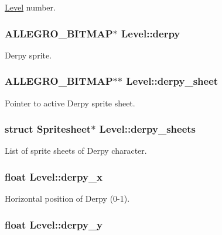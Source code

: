 \hyperlink{structLevel}{\-Level} number. \hypertarget{structLevel_ae33832497116b7a0c184959bbde21ee5}{
\subsubsection[{derpy}]{\setlength{\rightskip}{0pt plus 5cm}\-A\-L\-L\-E\-G\-R\-O\-\_\-\-B\-I\-T\-M\-A\-P$\ast$ {\bf \-Level\-::derpy}}}\label{structLevel_ae33832497116b7a0c184959bbde21ee5}
\-Derpy sprite. \hypertarget{structLevel_a0e02f3a5674a2ad3c23de22b6a4ed044}{
\subsubsection[{derpy\-\_\-sheet}]{\setlength{\rightskip}{0pt plus 5cm}\-A\-L\-L\-E\-G\-R\-O\-\_\-\-B\-I\-T\-M\-A\-P$\ast$$\ast$ {\bf \-Level\-::derpy\-\_\-sheet}}}\label{structLevel_a0e02f3a5674a2ad3c23de22b6a4ed044}
\-Pointer to active \-Derpy sprite sheet. \hypertarget{structLevel_aad19c0af5ac43ceb72df311d89bd4297}{
\subsubsection[{derpy\-\_\-sheets}]{\setlength{\rightskip}{0pt plus 5cm}struct {\bf \-Spritesheet}$\ast$ {\bf \-Level\-::derpy\-\_\-sheets}}}\label{structLevel_aad19c0af5ac43ceb72df311d89bd4297}
\-List of sprite sheets of \-Derpy character. \hypertarget{structLevel_ae5a97d5b61c70c63e93992a9ff3935f9}{
\subsubsection[{derpy\-\_\-x}]{\setlength{\rightskip}{0pt plus 5cm}float {\bf \-Level\-::derpy\-\_\-x}}}\label{structLevel_ae5a97d5b61c70c63e93992a9ff3935f9}
\-Horizontal position of \-Derpy (0-\/1). \hypertarget{structLevel_a7b3c0f5af134797a1ed21ef48da3ab00}{
\subsubsection[{derpy\-\_\-y}]{\setlength{\rightskip}{0pt plus 5cm}float {\bf \-Level\-::derpy\-\_\-y}}}\label{structLevel_a7b3c0f5af134797a1ed21ef48da3ab00}
